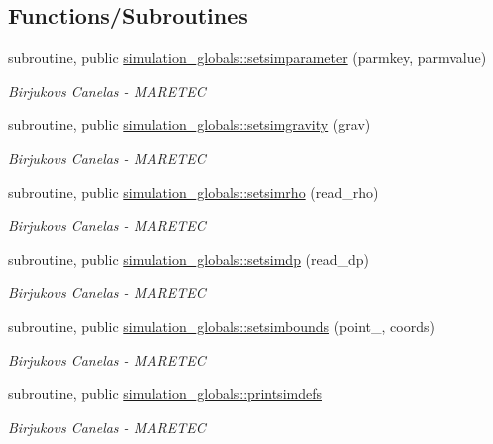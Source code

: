 \subsection*{Functions/\+Subroutines}
\begin{DoxyCompactItemize}
\item 
subroutine, public \mbox{\hyperlink{namespacesimulation__globals_a7a127d09219ed57ad8db3507dbbefe5b}{simulation\+\_\+globals\+::setsimparameter}} (parmkey, parmvalue)
\begin{DoxyCompactList}\small\item\em Birjukovs Canelas -\/ M\+A\+R\+E\+T\+EC \end{DoxyCompactList}\item 
subroutine, public \mbox{\hyperlink{namespacesimulation__globals_abe9252e2e73b8a074700d49b705664ef}{simulation\+\_\+globals\+::setsimgravity}} (grav)
\begin{DoxyCompactList}\small\item\em Birjukovs Canelas -\/ M\+A\+R\+E\+T\+EC \end{DoxyCompactList}\item 
subroutine, public \mbox{\hyperlink{namespacesimulation__globals_acb970c567557ee852be95afe8d3f2b0f}{simulation\+\_\+globals\+::setsimrho}} (read\+\_\+rho)
\begin{DoxyCompactList}\small\item\em Birjukovs Canelas -\/ M\+A\+R\+E\+T\+EC \end{DoxyCompactList}\item 
subroutine, public \mbox{\hyperlink{namespacesimulation__globals_a279b7a2988da04ca81146f0a8f154ca9}{simulation\+\_\+globals\+::setsimdp}} (read\+\_\+dp)
\begin{DoxyCompactList}\small\item\em Birjukovs Canelas -\/ M\+A\+R\+E\+T\+EC \end{DoxyCompactList}\item 
subroutine, public \mbox{\hyperlink{namespacesimulation__globals_a8e4aaa3352a4aa807b5cdf0a537c13e8}{simulation\+\_\+globals\+::setsimbounds}} (point\+\_\+, coords)
\begin{DoxyCompactList}\small\item\em Birjukovs Canelas -\/ M\+A\+R\+E\+T\+EC \end{DoxyCompactList}\item 
subroutine, public \mbox{\hyperlink{namespacesimulation__globals_a1683e8f5cab2101e7e3dbc91108b64a3}{simulation\+\_\+globals\+::printsimdefs}}
\begin{DoxyCompactList}\small\item\em Birjukovs Canelas -\/ M\+A\+R\+E\+T\+EC \end{DoxyCompactList}\item 

\end{DoxyCompactItemize}
